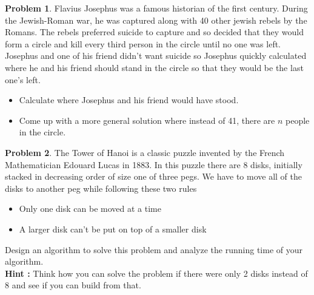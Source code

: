 \documentclass{article}
\theoremstyle{definition}
\newtheorem{Q}{Problem}
\begin{document}
\pagebreak
\begin{Q}
Flavius Josephus was a famous historian of the first century. During the Jewish-Roman war, he was captured along with 40 other jewish rebels by the Romans. The rebels preferred suicide to capture and so decided that they would form a circle and kill every third person in the circle until no one was left. Josephus and one of his friend didn't want suicide so Josephus quickly calculated where he and his friend should stand in the circle so that they would be the last one's left. 
\begin{itemize}
\item Calculate where Josephus and his friend would have stood.
\item Come up with a more general solution where instead of 41, there are $n$ people in the circle.
\end{itemize}
\end{Q}
\pagebreak
\begin{Q}
The Tower of Hanoi is a classic puzzle invented by the French Mathematician Edouard Lucas in 1883. In this puzzle there are 8 disks, initially stacked in decreasing order of size one of three pegs. We have to move all of the disks to another peg while following these two rules
\begin{itemize}
 \item Only one disk can be moved at a time
 \item A larger disk can't be put on top of a smaller disk
\end{itemize}
Design an algorithm to solve this problem and analyze the running time of your algorithm. \\
\textbf{Hint : }Think how you can solve the problem if there were only 2 disks instead of 8 and see if you can build from that.
\end{Q}
\end{document}
